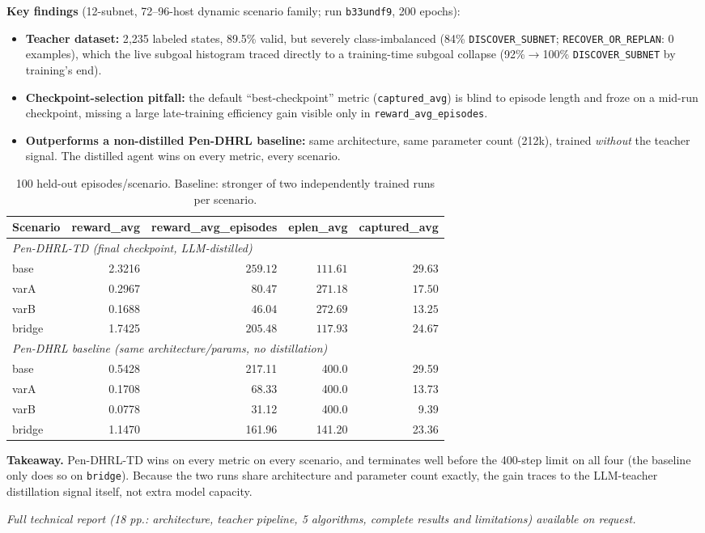 \documentclass[10pt]{article}
\newcommand{\code}[1]{\texttt{\small #1}}
\begin{document}
\textbf{Key findings} (12-subnet, 72--96-host dynamic scenario family; run \code{b33undf9}, 200 epochs):
\begin{itemize}[nosep,leftmargin=1.2em]
  \item \textbf{Teacher dataset:} 2{,}235 labeled states, 89.5\% valid, but severely
    class-imbalanced (84\% \code{DISCOVER\_SUBNET}; \code{RECOVER\_OR\_REPLAN}: 0 examples),
    which the live subgoal histogram traced directly to a training-time subgoal
    collapse (92\%$\to$100\% \code{DISCOVER\_SUBNET} by training's end).
  \item \textbf{Checkpoint-selection pitfall:} the default ``best-checkpoint'' metric
    (\code{captured\_avg}) is blind to episode length and froze on a mid-run checkpoint,
    missing a large late-training efficiency gain visible only in \code{reward\_avg\_episodes}.
  \item \textbf{Outperforms a non-distilled Pen-DHRL baseline:} same architecture,
    same parameter count (212k), trained \emph{without} the teacher signal. The
    distilled agent wins on every metric, every scenario.
\end{itemize}

\begin{table}[h]
\centering
\small
\begin{tabular}{lrrrr}
\toprule
Scenario & reward\_avg & reward\_avg\_episodes & eplen\_avg & captured\_avg \\
\midrule
\multicolumn{5}{l}{\textit{Pen-DHRL-TD (final checkpoint, LLM-distilled)}} \\
base   & 2.3216 & $\mathbf{259.12}$ & $\mathbf{111.61}$ & $\mathbf{29.63}$ \\
varA   & 0.2967 & $\mathbf{80.47}$  & $\mathbf{271.18}$ & $\mathbf{17.50}$ \\
varB   & 0.1688 & $\mathbf{46.04}$  & $\mathbf{272.69}$ & $\mathbf{13.25}$ \\
bridge & 1.7425 & $\mathbf{205.48}$ & $\mathbf{117.93}$ & $\mathbf{24.67}$ \\
\multicolumn{5}{l}{\textit{Pen-DHRL baseline (same architecture/params, no distillation)}} \\
base   & 0.5428 & 217.11 & 400.0 & 29.59 \\
varA   & 0.1708 & 68.33  & 400.0 & 13.73 \\
varB   & 0.0778 & 31.12  & 400.0 & 9.39 \\
bridge & 1.1470 & 161.96 & 141.20 & 23.36 \\
\bottomrule
\end{tabular}
\caption{\small 100 held-out episodes/scenario. Baseline: stronger of two
independently trained runs per scenario.}
\end{table}

\textbf{Takeaway.} Pen-DHRL-TD wins on every metric on every scenario, and
terminates well before the 400-step limit on all four (the baseline only does so on
\code{bridge}). Because the two runs share architecture and parameter count exactly,
the gain traces to the LLM-teacher distillation signal itself, not extra model
capacity.

{\small\textit{Full technical report (18 pp.: architecture, teacher pipeline,
5 algorithms, complete results and limitations) available on request.}}
\end{document}

